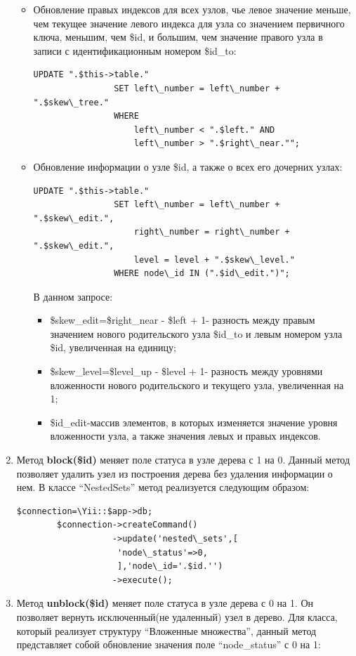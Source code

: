 \documentclass[a4paper,14pt]{extreport}
\theoremstyle{definition}
\begin{document}
\begin{enumerate}
\begin{itemize}
\item Обновление правых индексов для всех узлов, чье левое значение меньше, чем текущее значение левого индекса для узла со значением первичного ключа, меньшим, чем \$id, и большим, чем значение правого узла в записи с идентификационным номером \$id\_to:
\begin{verbatim}UPDATE ".$this->table."
				SET left\_number = left\_number + ".$skew\_tree."
				WHERE
					left\_number < ".$left." AND
					left\_number > ".$right\_near."";\end{verbatim}
\item  Обновление информации о узле \$id, а также о всех его дочерних узлах:
\begin{verbatim}UPDATE ".$this->table."
				SET left\_number = left\_number + ".$skew\_edit.",
					right\_number = right\_number + ".$skew\_edit.",
					level = level + ".$skew\_level."
				WHERE node\_id IN (".$id\_edit.")";\end{verbatim}
В данном запросе:
\begin{itemize}
\item \$skew\_edit=\$right\_near - \$left + 1- разность между правым значением нового родительского узла \$id\_to и левым номером узла \$id, увеличенная на единицу;
\item \$skew\_level=\$level\_up - \$level + 1- разность между уровнями вложенности нового родительского и текущего узла, увеличенная на 1;
\item \$id\_edit-массив элементов, в которых изменяется значение уровня вложенности узла, а также значения левых и правых индексов.
\end{itemize}
\end{itemize}
\item Метод \textbf{block(\$id)} меняет поле статуса в узле дерева с 1 на 0. Данный метод позволяет удалить узел из построения дерева без удаления информации о нем. В классе “NestedSets” метод реализуется следующим образом:
\begin{verbatim}$connection=\Yii::$app->db;
        $connection->createCommand()
                   ->update('nested\_sets',[
                    'node\_status'=>0,
                    ],'node\_id='.$id.'')
                   ->execute();\end{verbatim}
\item Метод \textbf{unblock(\$id)} меняет поле статуса в узле дерева с 0 на 1. Он позволяет вернуть исключенный(не удаленный) узел в дерево. Для класса, который реализует структуру “Вложенные множества”, данный метод представляет собой обновление значения поле “node\_status” с 0 на 1:

\end{enumerate}
\end{document}
